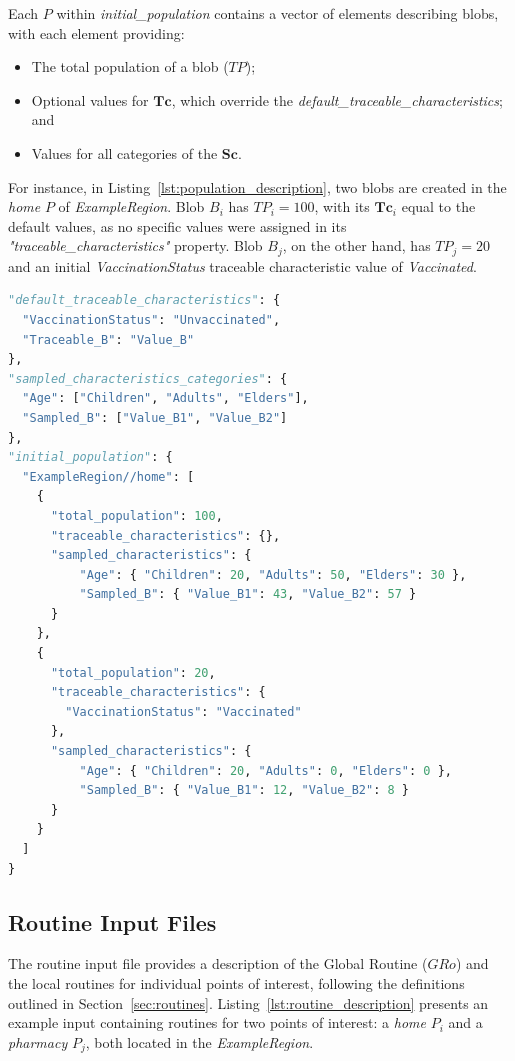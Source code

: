 \documentclass[pdflatex,sn-mathphys-num]{sn-jnl}%
\theoremstyle{thmstyleone}%
\theoremstyle{thmstyletwo}%
\theoremstyle{thmstylethree}%
\begin{document}
\begin{appendices}
Each $P$ within \textit{initial\_population} contains a vector of elements describing blobs, with each element providing:
\begin{itemize}
    \item The total population of a blob ($TP$);
    \item Optional values for $\bm{Tc}$, which override the \textit{default\_traceable\_characteristics}; and
    \item Values for all categories of the $\bm{Sc}$. 
\end{itemize}  
For instance, in Listing~\ref{lst:population_description}, two blobs are created in the \textit{home} $P$ of \textit{ExampleRegion}. Blob $B_i$ has $TP_i = 100$, with its $\bm{Tc}_i$ equal to the default values, as no specific values were assigned in its \textit{"traceable\_characteristics"} property. Blob $B_j$, on the other hand, has $TP_j = 20$ and an initial \textit{VaccinationStatus} traceable characteristic value of \textit{Vaccinated}.

\begin{lstlisting}[language={Python},
caption={Example of a population input file.},
captionpos=b, label={lst:population_description}, basicstyle=\footnotesize]
"default_traceable_characteristics": {
  "VaccinationStatus": "Unvaccinated",
  "Traceable_B": "Value_B"
},
"sampled_characteristics_categories": {
  "Age": ["Children", "Adults", "Elders"],
  "Sampled_B": ["Value_B1", "Value_B2"]
},
"initial_population": {
  "ExampleRegion//home": [
    {
      "total_population": 100,
      "traceable_characteristics": {},
      "sampled_characteristics": {
          "Age": { "Children": 20, "Adults": 50, "Elders": 30 },
          "Sampled_B": { "Value_B1": 43, "Value_B2": 57 }
      }
    },
    {
      "total_population": 20,
      "traceable_characteristics": {
        "VaccinationStatus": "Vaccinated"
      },
      "sampled_characteristics": {
          "Age": { "Children": 20, "Adults": 0, "Elders": 0 },
          "Sampled_B": { "Value_B1": 12, "Value_B2": 8 }
      }
    }
  ]
}
\end{lstlisting}

\subsection{Routine Input Files}
\label{app:input_routine}

The routine input file provides a description of the Global Routine ($GRo$) and the local routines for individual points of interest, following the definitions outlined in Section~\ref{sec:routines}. Listing~\ref{lst:routine_description} presents an example input containing routines for two points of interest: a \textit{home} $P_i$ and a \textit{pharmacy} $P_j$, both located in the \textit{ExampleRegion}.


\end{appendices}
\end{document}

